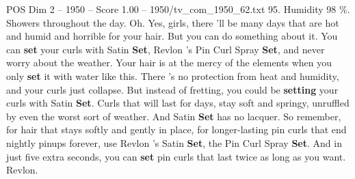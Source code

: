 \begin{textsample}{POS Dim 2 – 1950 – Score 1.00 – 1950/tv\_com\_1950\_62.txt}  \label{ex:f2_pos_019}
95.
Humidity 98 \%.
Showers throughout the day.
Oh.
Yes, girls, there 'll be many days that are hot and humid and horrible for your hair.
But you can do something about it.
You can \textbf{set} your curls with Satin \textbf{Set}, Revlon 's Pin Curl Spray \textbf{Set}, and never worry about the weather.
Your hair is at the mercy of the elements when you only \textbf{set} it with water like this.
There 's no protection from heat and humidity, and your curls just collapse.
But instead of fretting, you could be \textbf{setting} your curls with Satin \textbf{Set}.
Curls that will last for days, stay soft and springy, unruffled by even the worst sort of weather.
And Satin \textbf{Set} has no lacquer.
So remember, for hair that stays softly and gently in place, for longer-lasting pin curls that end nightly pinups forever, use Revlon 's Satin \textbf{Set}, the Pin Curl Spray \textbf{Set}.
And in just five extra seconds, you can \textbf{set} pin curls that last twice as long as you want.
Revlon.

\end{textsample}
